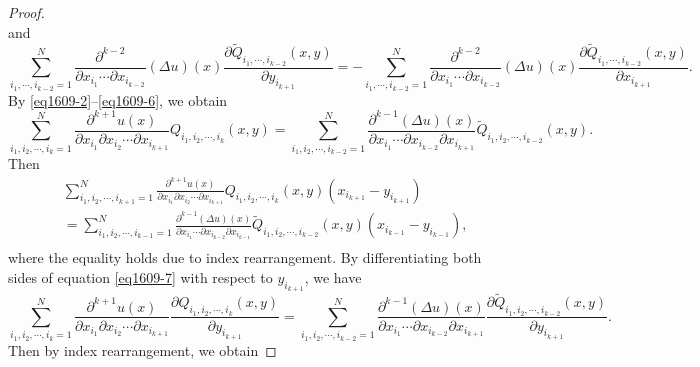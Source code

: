 \documentclass[11pt,reqno]{article}
\numberwithin{equation}{section}
\begin{document}
\begin{proof}
\begin{equation}
				\end{equation}
				and 
				\begin{equation}\label{eq1609-6}
					\sum_{i_1,\cdots,i_{k-2}=1}^{N}\frac{\partial^{k-2}}{\partial x_{i_1} \cdots \partial x_{i_{k-2}}} (\Delta u)(x) \frac{\partial\widetilde{Q}_{i_1,\cdots,i_{k-2}}(x,y)}{\partial y_{i_{k+1}} }=-\sum_{i_1,\cdots,i_{k-2}=1}^{N}\frac{\partial^{k-2}}{\partial x_{i_1} \cdots \partial x_{i_{k-2}}} (\Delta u)(x) \frac{\partial\widetilde{Q}_{i_1,\cdots,i_{k-2}}(x,y)}{\partial x_{i_{k+1}} }.
				\end{equation}
				By \eqref{eq1609-2}--\eqref{eq1609-6}, we obtain  
				\begin{equation}\label{eq1609-7}
					\sum_{i_1,i_2,\cdots,i_k=1}^{N}\frac{\partial^{k+1} u(x)}{\partial x_{i_1} \partial x_{i_2}\cdots \partial x_{i_{k+1}}}Q_{i_1,i_2,\cdots,i_k}(x,y)
					=\sum_{i_1,i_2,\cdots,i_{k-2}=1}^{N}\frac{\partial^{k-1}(\Delta u)(x)}{\partial x_{i_1}\cdots \partial x_{i_{k-2}}\partial x_{i_{k+1}}}  \widetilde{Q}_{i_1,i_2,\cdots,i_{k-2}}(x,y).
				\end{equation}
				Then 
				\begin{equation}\label{eq1709-3}
					\begin{aligned}
						&\sum_{i_1,i_2,\cdots,i_{k+1}=1}^{N}\frac{\partial^{k+1} u(x)}{\partial x_{i_1} \partial x_{i_2}\cdots \partial x_{i_{k+1}}}Q_{i_1,i_2,\cdots,i_k}(x,y)(x_{i_{k+1}}-y_{i_{k+1}})\\
						&=\sum_{i_1,i_2,\cdots,i_{k-1}=1}^{N}\frac{\partial^{k-1}(\Delta u)(x)}{\partial x_{i_1}\cdots \partial x_{i_{k-2}}\partial x_{i_{k-1}}}  \widetilde{Q}_{i_1,i_2,\cdots,i_{k-2}}(x,y)(x_{i_{k-1}}-y_{i_{k-1}}),\\
					\end{aligned}
				\end{equation}
				where the equality holds due to index rearrangement.
				By differentiating both sides of equation \eqref{eq1609-7} with respect to $y_{i_{k+1}}$, we have
				\begin{equation}\label{eq1709-1}
					\sum_{i_1,i_2,\cdots,i_k=1}^{N}\frac{\partial^{k+1} u(x)}{\partial x_{i_1} \partial x_{i_2}\cdots \partial x_{i_{k+1}}}\frac{\partial Q_{i_1,i_2,\cdots,i_k}(x,y)}{\partial y_{i_{k+1}}}
					=\sum_{i_1,i_2,\cdots,i_{k-2}=1}^{N}\frac{\partial^{k-1}(\Delta u)(x)}{\partial x_{i_1}\cdots \partial x_{i_{k-2}}\partial x_{i_{k+1}}}  \frac{\partial\widetilde{Q}_{i_1,i_2,\cdots,i_{k-2}}(x,y)}{\partial y_{i_{k+1}}}.
				\end{equation}
				Then by index rearrangement, we obtain 

\end{proof}
\end{document}
